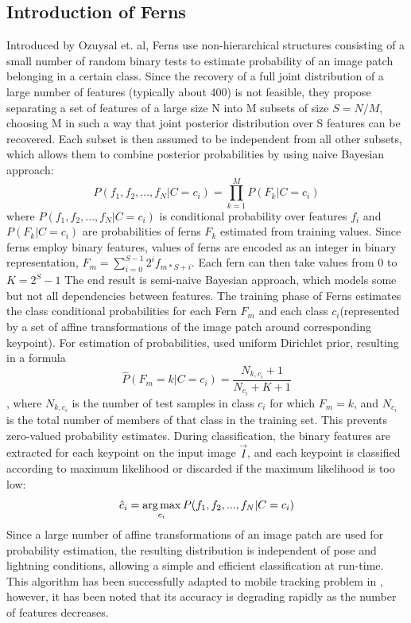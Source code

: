 \subsection{Introduction of Ferns}
\label{Intro}
Introduced by  Ozuysal et. al, Ferns use non-hierarchical structures consisting of a small number of random binary tests to estimate probability of an image patch belonging in a certain class.
Since the recovery of a full joint distribution of a large number of features (typically about 400) is not feasible, they propose separating a set of features of a large size N into M subsets of size $S=N/M$, choosing M in such a way that joint posterior distribution over S features can be recovered. Each subset is then assumed to be independent from all other subsets, which allows them to combine posterior probabilities by using naive Bayesian approach: 
\begin{equation}
\label{naive}
P(f_1,f_2,...,f_N|C=c_i)=\prod_{k=1}^{M}P(F_k|C=c_i)
\end{equation}
where $P(f_1,f_2,...,f_N|C=c_i)$ is conditional probability over features $f_i$ and $P(F_k|C=c_i)$ are probabilities of ferns $F_k$ estimated from training values. Since ferns employ binary features, values of ferns are encoded as an integer in binary representation, $F_m=\sum_{i=0}^{S-1}2^i f_{m*S+i}$. Each fern can then take values from 0 to $K=2^S-1$ The end result is semi-naive Bayesian approach, which models some but not all dependencies between features. 
The training phase of Ferns estimates the class conditional probabilities for each Fern $F_m$ and each class $c_i$(represented by a set of affine transformations of the image patch around corresponding keypoint). For estimation of probabilities, \cite{Ferns1} used uniform Dirichlet prior, resulting in a formula 
\begin{equation}
\label{approxD}
\hat{P}(F_m=k|C=c_i)=\frac{N_{k,c_i}+1}{N_{c_i}+K+1}
\end{equation}, where $N_{k,c_i}$ is the number of test samples in class $c_i$ for which $F_m=k$, and $N_{c_i}$ is the total number of members of that class in the training set. This prevents zero-valued probability estimates.
During classification, the binary features are extracted for each keypoint on the input image $\vec{I}$, and each keypoint is classified according to maximum likelihood or discarded if the maximum likelihood is too low: 
\begin{equation}
\label{estim}
\hat{c}_i=\operatorname*{arg\,max}_{c_i}{P(f_1,f_2,...,f_N|C=c_i)}
\end{equation}
Since a large number of affine transformations of an image patch are used for probability estimation, the resulting distribution is independent of pose and lightning conditions, allowing a simple and efficient classification at run-time.
This algorithm has been successfully adapted to mobile tracking problem in \cite{Mobi}, however, it has been noted that its accuracy is degrading rapidly as the number of features decreases.

